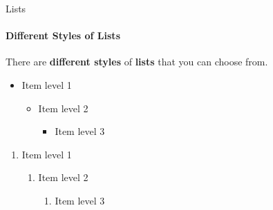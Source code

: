 \documentclass[aspectratio=169]{beamer}
\begin{document}
\begin{frame}{Lists}
    \framesubtitle{Different Styles of Lists}

    \begin{coloredblock}[yellow]
        \centering
        There are \textbf{different styles} of \textbf{lists} that you can choose from.
    \end{coloredblock}

    \begin{minipage}[t]{0.49\textwidth}
        \begin{coloredblock}
            \begin{itemize}
                \item Item level 1
                \begin{itemize}
                    \item Item level 2
                    \begin{itemize}
                        \item Item level 3
                    \end{itemize}
                \end{itemize}
            \end{itemize}
        \end{coloredblock}

        \begin{coloredblock}
            \begin{enumerate}
            \item Item level 1
                \begin{enumerate}
                    \item Item level 2
                    \begin{enumerate}
                        \item Item level 3
                    \end{enumerate}
                \end{enumerate}
            \end{enumerate}
        \end{coloredblock}
        

\end{minipage}
\end{frame}
\end{document}
